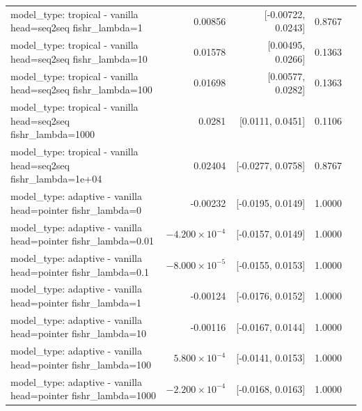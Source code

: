 \documentclass[10pt]{article}
\makeatletter
\newcommand{\stackcell}[1]{\begin{tabular}[t]{@{}l@{}}#1\end{tabular}}
\makeatother
\begin{document}
{\begin{longtable}{lrrrl}
\stackcell{model\_type: tropical - vanilla\\\footnotesize head=seq2seq fishr\_lambda=1 } & 0.00856 & [-0.00722, 0.0243] & 0.8767 & \\
\stackcell{model\_type: tropical - vanilla\\\footnotesize head=seq2seq fishr\_lambda=10 } & 0.01578 & [0.00495, 0.0266] & 0.1363 & \\
\stackcell{model\_type: tropical - vanilla\\\footnotesize head=seq2seq fishr\_lambda=100 } & 0.01698 & [0.00577, 0.0282] & 0.1363 & \\
\stackcell{model\_type: tropical - vanilla\\\footnotesize head=seq2seq fishr\_lambda=1000 } & 0.0281 & [0.0111, 0.0451] & 0.1106 & \\
\stackcell{model\_type: tropical - vanilla\\\footnotesize head=seq2seq fishr\_lambda=1e+04 } & 0.02404 & [-0.0277, 0.0758] & 0.8767 & \\
\stackcell{model\_type: adaptive - vanilla\\\footnotesize head=pointer fishr\_lambda=0 } & -0.00232 & [-0.0195, 0.0149] & 1.0000 & \\
\stackcell{model\_type: adaptive - vanilla\\\footnotesize head=pointer fishr\_lambda=0.01 } & $-4.200\times10^{-4}$ & [-0.0157, 0.0149] & 1.0000 & \\
\stackcell{model\_type: adaptive - vanilla\\\footnotesize head=pointer fishr\_lambda=0.1 } & $-8.000\times10^{-5}$ & [-0.0155, 0.0153] & 1.0000 & \\
\stackcell{model\_type: adaptive - vanilla\\\footnotesize head=pointer fishr\_lambda=1 } & -0.00124 & [-0.0176, 0.0152] & 1.0000 & \\
\stackcell{model\_type: adaptive - vanilla\\\footnotesize head=pointer fishr\_lambda=10 } & -0.00116 & [-0.0167, 0.0144] & 1.0000 & \\
\stackcell{model\_type: adaptive - vanilla\\\footnotesize head=pointer fishr\_lambda=100 } & $5.800\times10^{-4}$ & [-0.0141, 0.0153] & 1.0000 & \\
\stackcell{model\_type: adaptive - vanilla\\\footnotesize head=pointer fishr\_lambda=1000 } & $-2.200\times10^{-4}$ & [-0.0168, 0.0163] & 1.0000 & \\

\end{longtable}}
\end{document}
